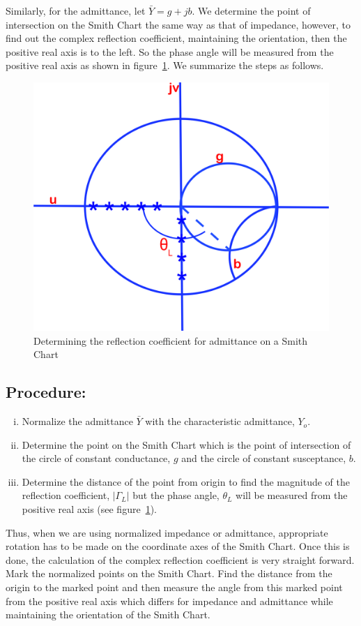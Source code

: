 Similarly, for the admittance, let $\bar{Y} = g + jb$. We determine the point of intersection on the Smith Chart the same way as that of impedance, however, to find out the complex reflection coefficient, maintaining the orientation, then the positive real axis is to the left. So the phase angle will be measured from the positive real axis as shown in figure~\ref{fig:kjhgfds}. We summarize the steps as follows.
\begin{figure}[h]
\centering
\includegraphics[width=0.7\linewidth]{./graphics/KJHGFDS}
\caption{Determining the reflection coefficient for admittance on a Smith Chart}
\label{fig:kjhgfds}
\end{figure}
 
\subsection*{Procedure:}
\begin{enumerate}[(i)]
\item Normalize the admittance $\bar{Y}$ with the characteristic admittance, $Y_o$.
\item Determine the point on the Smith Chart which is the point of intersection of the circle of constant conductance, $g$ and the circle of constant susceptance, $b$.
\item Determine the distance of the point from origin to find the magnitude of the reflection coefficient,  $|\Gamma_L|$ but the phase angle, $\theta_L$ will be measured from the  positive real axis (see figure~\ref{fig:kjhgfds}). 
\end{enumerate}

Thus, when we are using normalized impedance or admittance, appropriate rotation has to be made on the coordinate axes of the Smith Chart. Once this is done, the calculation of the complex reflection coefficient is very straight forward. Mark the normalized points on the Smith Chart. Find the distance from the origin to the marked point and then measure the angle from this marked point from the positive real axis which differs for impedance and admittance while maintaining the orientation of the Smith Chart. 


